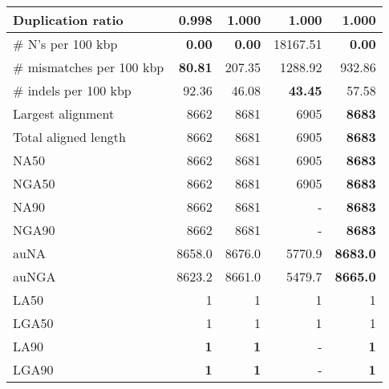 \documentclass[12pt,a4paper]{article}
\begin{document}
\begin{table}[ht]
\begin{center}
\begin{tabular}{|l*{4}{|r}|}
Duplication ratio & {\bf 0.998} & 1.000 & 1.000 & 1.000 \\ \hline
\# N's per 100 kbp & {\bf 0.00} & {\bf 0.00} & 18167.51 & {\bf 0.00} \\ \hline
\# mismatches per 100 kbp & {\bf 80.81} & 207.35 & 1288.92 & 932.86 \\ \hline
\# indels per 100 kbp & 92.36 & 46.08 & {\bf 43.45} & 57.58 \\ \hline
Largest alignment & 8662 & 8681 & 6905 & {\bf 8683} \\ \hline
Total aligned length & 8662 & 8681 & 6905 & {\bf 8683} \\ \hline
NA50 & 8662 & 8681 & 6905 & {\bf 8683} \\ \hline
NGA50 & 8662 & 8681 & 6905 & {\bf 8683} \\ \hline
NA90 & 8662 & 8681 & - & {\bf 8683} \\ \hline
NGA90 & 8662 & 8681 & - & {\bf 8683} \\ \hline
auNA & 8658.0 & 8676.0 & 5770.9 & {\bf 8683.0} \\ \hline
auNGA & 8623.2 & 8661.0 & 5479.7 & {\bf 8665.0} \\ \hline
LA50 & 1 & 1 & 1 & 1 \\ \hline
LGA50 & 1 & 1 & 1 & 1 \\ \hline
LA90 & {\bf 1} & {\bf 1} & - & {\bf 1} \\ \hline
LGA90 & {\bf 1} & {\bf 1} & - & {\bf 1} \\ \hline
\end{tabular}
\end{center}
\end{table}
\end{document}
